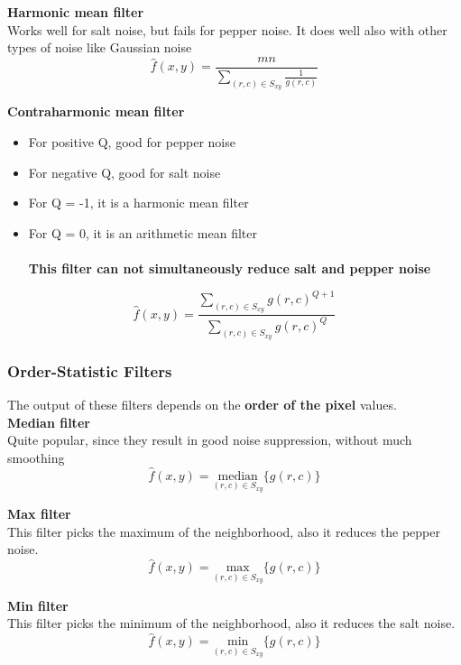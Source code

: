 \textbf{Harmonic mean filter}\\
Works well for salt noise, but fails for pepper noise. It does well also with other types of noise like Gaussian noise
\begin{equation}
	\hat{f}(x,y)= \frac{mn}{\sum\limits_{(r,c)\in S_{xy}} \frac{1}{g(r,c)}}
\end{equation}

\textbf{Contraharmonic mean filter}
\begin{itemize}
\item For positive Q, good for pepper noise
\item For negative Q, good for salt noise
\item For Q = -1, it is a harmonic mean filter
\item For Q = 0, it is an arithmetic mean filter\\ \\
\textbf{This filter can not simultaneously reduce salt and pepper noise}
\end{itemize}

\begin{equation}
	\hat{f}(x,y)= \frac{\sum\limits_{(r,c)\in S_{xy}} g(r,c)^{Q+1}}{\sum\limits_{(r,c)\in S_{xy}} g(r,c)^Q}
\end{equation}

\subsubsection{Order-Statistic Filters }

The output of these filters depends on the \textbf{order of the pixel} values. \\

\textbf{Median filter}\\
Quite popular, since they result in good noise suppression, without much smoothing \\
\begin{equation}
	\hat{f}(x,y)=\underset{(r,c) \in S_{xy}}{\text{median}}\{g(r,c) \}
\end{equation}

\textbf{Max filter}\\
This filter picks the maximum of the neighborhood, also it reduces the pepper noise.
\begin{equation}
	\hat{f}(x,y)=\underset{(r,c) \in S_{xy}}{\text{max}}\{g(r,c) \}
\end{equation}

\textbf{Min filter}\\
This filter picks the minimum of the neighborhood, also it reduces the salt noise.
\begin{equation}
	\hat{f}(x,y)=\underset{(r,c) \in S_{xy}}{\text{min}}\{g(r,c) \}
\end{equation}

